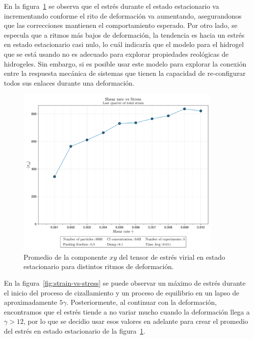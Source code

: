 \documentclass[../main.tex]{subfiles}
\begin{document}
En la figura~\ref{fig:shear-rate-vs-stress} se observa que el estrés durante el estado estacionario va incrementando conforme el rito de deformación va aumentando, asegurandonos que las correcciones mantienen el comportamiento esperado.
Por otro lado, se especula que a ritmos más bajos de deformación, la tendencia es hacia un estrés en estado estacionario casi nulo, lo cuál indicaría que el modelo para el hidrogel que se está usando no es adecuado para explorar propiedades reológicas de hidrogeles.
Sin embargo, si es posible usar este modelo para explorar la conexión entre la respuesta mecánica de sistemas que tienen la capacidad de re-configurar todos sus enlaces durante una deformación.

\begin{figure}[h]
    \centering
    \includegraphics[width=0.9\textwidth]{../Figures/system-2025-05-22-194804-CL-0.03/ShearRate-vs-Stress.png}
    \caption{Promedio de la componente $xy$ del tensor de estrés virial en estado estacionario para distintos ritmos de deformación.}\label{fig:shear-rate-vs-stress}
\end{figure}

En la figura~\ref{fig:strain-vs-stress} se puede observar un máximo de estrés durante el inicio del proceso de cizallamiento y un proceso de equilibrio en un lapso de aproximadamente $5\gamma$. 
Posteriormente, al continuar con la deformación, encontramos que el estrés tiende a no variar mucho cuando la deformación llega a $\gamma>12$, por lo que se decidio usar esos valores en adelante para crear el promedio del estrés en estado estacionario de la figura~\ref{fig:shear-rate-vs-stress}.
\end{document}
